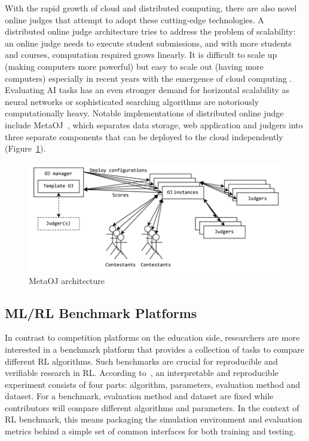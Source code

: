 \documentclass[fyp]{socreport}
\begin{document}
With the rapid growth of cloud and distributed computing, there are also novel online judges that attempt to adopt these cutting-edge technologies. A distributed online judge architecture tries to address the problem of scalability: an online judge needs to execute student submissions, and with more students and courses, computation required grows linearly. It is difficult to scale up (making computers more powerful) but easy to scale out (having more computers) especially in recent years with the emergence of cloud computing \cite{RN17}. Evaluating AI tasks has an even stronger demand for horizontal scalability as neural networks or sophisticated searching algorithms are notoriously computationally heavy. Notable implementations of distributed online judge include MetaOJ~\cite{metaoj}, which separates data storage, web application and judgers into three separate components that can be deployed to the cloud independently (Figure~\ref{fig:metaoj}).

\begin{figure}[H]
    \centering
    \includegraphics{images/metaoj.png}
    \caption{MetaOJ architecture}
    \label{fig:metaoj}
\end{figure}

\subsection{ML/RL Benchmark Platforms}
In contrast to competition platforms on the education side, researchers are more interested in a benchmark platform that provides a collection of tasks to compare different RL algorithms. Such benchmarks are crucial for reproducible and verifiable research in RL. According to~\cite{RN20}, an interpretable and reproducible experiment consists of four parts: algorithm, parameters, evaluation method and dataset. For a benchmark, evaluation method and dataset are fixed while contributors will compare different algorithms and parameters. In the context of RL benchmark, this means packaging the simulation environment and evaluation metrics behind a simple set of common interfaces for both training and testing.
\end{document}
